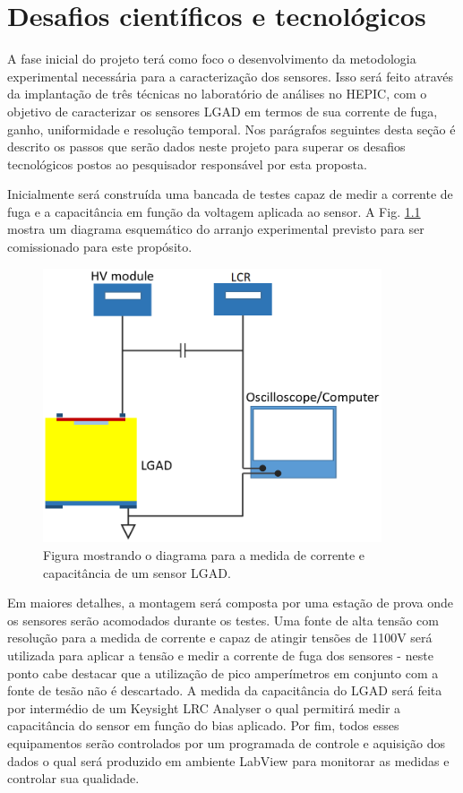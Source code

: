 \chapter{Desafios científicos e tecnológicos}


A fase inicial do projeto terá como foco o desenvolvimento da metodologia experimental necessária para a caracterização dos sensores. Isso será feito através da implantação de três técnicas no laboratório de análises no HEPIC, com o objetivo de caracterizar os sensores LGAD em termos de sua corrente de fuga, ganho, uniformidade e resolução temporal. Nos parágrafos seguintes desta seção é descrito os passos que serão dados neste projeto para superar os desafios tecnológicos postos ao pesquisador responsável por esta proposta. 

Inicialmente será construída uma bancada de testes capaz de medir a corrente de fuga e a capacitância em função da voltagem aplicada ao sensor. A Fig. \ref{setup1} mostra um diagrama esquemático do arranjo experimental previsto para ser comissionado para este propósito.

\begin{figure}
    \centering
    \includegraphics[width=10.0cm]{assets/iv_cv.png}
    \caption{Figura mostrando o diagrama para a medida de corrente e capacitância de um sensor LGAD.}
    \label{setup1}
\end{figure}

Em maiores detalhes, a montagem será composta por uma estação de prova onde os sensores serão acomodados durante os testes. Uma fonte de alta tensão com resolução para a medida de corrente e capaz de atingir tensões de 1100V será utilizada para aplicar a tensão e medir a corrente de fuga dos sensores - neste ponto cabe destacar que a utilização de pico amperímetros em conjunto com a fonte de tesão não é descartado. A medida da capacitância do LGAD será feita por intermédio de um Keysight LRC Analyser o qual permitirá medir a capacitância do sensor em função do bias aplicado. Por fim, todos esses equipamentos serão controlados por um programada de controle e aquisição dos dados o qual será produzido em ambiente LabView para monitorar as medidas e controlar sua qualidade.


